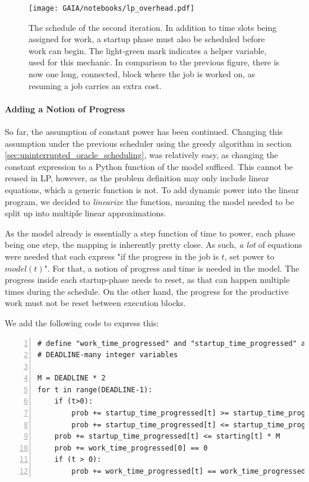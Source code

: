 \begin{figure}
    \texttt{[image: GAIA/notebooks/lp\_overhead.pdf]}
    \caption{The schedule of the second iteration. In addition to time slots being assigned for work, a startup phase must also be scheduled before work can begin. The light-green mark indicates a helper variable, used for this mechanic. In comparison to the previous figure, there is now one long, connected, block where the job is worked on, as resuming a job carries an extra cost.}
    \label{fig:lp_overhead}
\end{figure}

\paragraph{Adding a Notion of Progress}

So far, the assumption of constant power has been continued.
Changing this assumption under the previous scheduler using the greedy algorithm in section \ref{sec:uninterrupted_oracle_scheduling}, was relatively easy, as changing the constant expression to a Python function of the model sufficed. 
This cannot be reused in LP, however, as the problem definition may only include linear equations, which a generic function is not. 
To add dynamic power into the linear program, we decided to \emph{linearize} the function, meaning the model needed to be split up into multiple linear approximations.

As the model already is essentially a step function of time to power, each phase being one step, the mapping is inherently pretty close. 
As such, \emph{a lot} of equations were needed that each express "if the progress in the job is $t$, set power to $model(t)$". 
For that, a notion of progress and time is needed in the model.
The progress inside each startup-phase needs to reset, as that can happen multiple times during the schedule. 
On the other hand, the progress for the productive work must not be reset between execution blocks. 

We add the following code to express this:

\begin{minipage}{\linewidth}
\begin{lstlisting}[frame=single, numbers=left, caption={Progress Variables in LP}, label={list:lp_progress}, basicstyle=\ttfamily, breaklines]
# define "work_time_progressed" and "startup_time_progressed" as 
# DEADLINE-many integer variables

M = DEADLINE * 2
for t in range(DEADLINE-1):
    if (t>0):
        prob += startup_time_progressed[t] >= startup_time_progressed[t-1] + 1 - (1 - starting[t]) * M 
        prob += startup_time_progressed[t] <= startup_time_progressed[t-1] + 1 + (1 - starting[t]) * M
    prob += startup_time_progressed[t] <= starting[t] * M 
    prob += work_time_progressed[0] == 0
    if (t > 0):
        prob += work_time_progressed[t] == work_time_progressed[t-1] + work[t]
\end{lstlisting}
\end{minipage}


